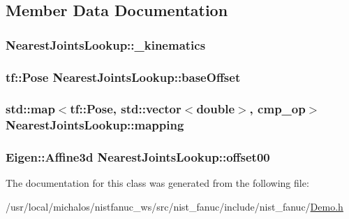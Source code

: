\subsection{Member Data Documentation}
\hypertarget{classNearestJointsLookup_a69da920a075aa530137c8e14a0a4cd29}{
\subsubsection[{\-\_\-kinematics}]{ Nearest\-Joints\-Lookup\-::\-\_\-kinematics\hspace{0.3cm}{\ttfamily [protected]}}}\label{classNearestJointsLookup_a69da920a075aa530137c8e14a0a4cd29}
\hypertarget{classNearestJointsLookup_a8cba42bc78dd12e06e2e55ba322ee54a}{
\subsubsection[{base\-Offset}]{\setlength{\rightskip}{0pt plus 5cm}tf\-::\-Pose Nearest\-Joints\-Lookup\-::base\-Offset\hspace{0.3cm}{\ttfamily [protected]}}}\label{classNearestJointsLookup_a8cba42bc78dd12e06e2e55ba322ee54a}
\hypertarget{classNearestJointsLookup_ab60905a02c612e64df13dfa6de3cbe1f}{
\subsubsection[{mapping}]{\setlength{\rightskip}{0pt plus 5cm}std\-::map$<$tf\-::\-Pose, std\-::vector$<$double$>$, {\bf cmp\-\_\-op}$>$ Nearest\-Joints\-Lookup\-::mapping\hspace{0.3cm}{\ttfamily [protected]}}}\label{classNearestJointsLookup_ab60905a02c612e64df13dfa6de3cbe1f}
\hypertarget{classNearestJointsLookup_aedeee24c67ca93205bdb25d8c5a25f0e}{
\subsubsection[{offset00}]{\setlength{\rightskip}{0pt plus 5cm}Eigen\-::\-Affine3d Nearest\-Joints\-Lookup\-::offset00\hspace{0.3cm}{\ttfamily [protected]}}}\label{classNearestJointsLookup_aedeee24c67ca93205bdb25d8c5a25f0e}


The documentation for this class was generated from the following file\-:\begin{DoxyCompactItemize}
\item 
/usr/local/michalos/nistfanuc\-\_\-ws/src/nist\-\_\-fanuc/include/nist\-\_\-fanuc/\hyperlink{Demo_8h}{Demo.\-h}\end{DoxyCompactItemize}
